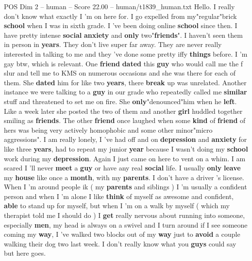 \begin{textsample}{POS Dim 2 – human – Score 22.00 – human/t1839\_human.txt}  \label{ex:f2_pos_028}
Hello.
I really don't know what exactly I 'm on here for.
I go expelled from my"regular"brick \textbf{school} when I was in sixth grade.
I 've been doing online \textbf{school} since then.
I have pretty intense \textbf{social} \textbf{anxiety} and \textbf{only} two"\textbf{friends}".
I haven't seen them in person in \textbf{years}.
They don't live super far away.
They are never really interested in talking to me and they 've done some pretty iffy \textbf{things} before.
I 'm gay btw, which is relevant.
One \textbf{friend} \textbf{dated} this \textbf{guy} who would call me the f slur and tell me to KMS on numerous occasions and she was there for each of them.
She \textbf{dated} him for like two \textbf{years}, there \textbf{break} up was unrelated.
Another instance we were talking to a \textbf{guy} in our grade who repeatedly called me \textbf{similar} stuff and threatened to set me on fire.
She \textbf{only}"denounced"him when he \textbf{left}.
Like a week later she posted the two of them and another \textbf{girl} huddled together smiling as \textbf{friends}.
The other \textbf{friend} once laughed when some \textbf{kind} of \textbf{friend} of hers was being very actively homophobic and some other minor"micro aggressions".
I am really lonely, I 've had off and on \textbf{depression} and \textbf{anxiety} for like three \textbf{years}, had to repeat my junior \textbf{year} because I wasn't doing my \textbf{school} work during my \textbf{depression}.
Again I just came on here to vent on a whim.
I am scared I 'll never \textbf{meet} a \textbf{guy} or have any real \textbf{social} life.
I usually \textbf{only} \textbf{leave} my \textbf{house} like once a \textbf{month}, with my \textbf{parents}.
I don't have a driver 's license.
When I 'm around people ik ( my \textbf{parents} and siblings ) I 'm usually a confident person and when I 'm alone I like \textbf{think} of myself as awesome and confident, \textbf{able} to stand up for myself, but when I 'm on a walk by myself ( which my therapist told me I should do ) I \textbf{get} really nervous about running into someone, especially \textbf{men}, my head is always on a swivel and I turn around if I see someone coming my \textbf{way}, I 've walked two blocks out of my \textbf{way} just to \textbf{avoid} a couple walking their dog two last week.
I don't really know what you \textbf{guys} could say but here goes.

\end{textsample}
